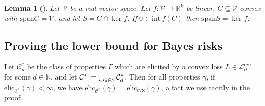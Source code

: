 \documentclass[11pt]{article} %
\newcommand{\Comments}{1}
\newcommand{\mytodo}[2]{\ifnum\Comments=1%
	\todo[linecolor=#1!80!black,backgroundcolor=#1,bordercolor=#1!80!black]{#2}\fi}
\newcommand{\btw}[1]{}%
\newcommand{\reals}{\mathbb{R}}
\newcommand{\interior}{\mathrm{int}\,}
\newcommand{\elic}{\mathrm{elic}}
\newcommand{\eliccvx}{\mathrm{elic}_\mathrm{cvx}}
\newcommand{\spn}{\mathrm{span}}
\newcommand{\C}{\mathcal{C}}
\newcommand{\Lcvx}{\mathcal{L}^{\mathrm{cvx}}}
\newcommand{\V}{\mathcal{V}}
\newtheorem{lemma}{Lemma}
\begin{document}
\begin{lemma}[{\citet[Lemma 14]{frongillo2020elicitation}}]
  \label{lem:lin-alg-span}
  Let $\V$ be a real vector space.
  Let $f:\V\to\reals^k$ be linear, $C\subseteq \V$ convex with $\spn C = \V$, and let $S = C \cap \ker f$.
  If $0 \in \interior f(C)$ then $\spn S = \ker f$.
\end{lemma}

\subsection{Proving the lower bound for Bayes risks}

Let $\C^*_d$ be the class of properties $\Gamma$ which are elicited by a convex loss $L\in\Lcvx_d$ for some $d\in\mathbb{N}$, and let $\C^*\defeq \bigcup_{d\in\mathbb{N}} \C^*_d$.
Then for all properties $\gamma$, if $\elic_{\C^*}(\gamma) < \infty$, we have $\elic_{\C^*}(\gamma) = \eliccvx(\gamma)$, a fact we use tacitly in the proof.\btw{When we add the stuff on entropy and norms, we'll need to actually define $\Lcvx_{\infty}$, which is a whole other can of worms... but totally fine actually.  Fun times for later :-]}
\end{document}
